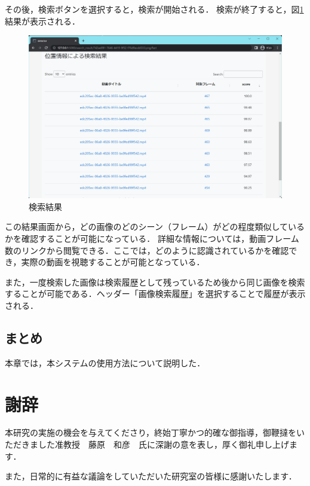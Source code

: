 \documentclass[a4j,12pt,dvipdfmx]{jreport}
\begin{document}
その後，検索ボタンを選択すると，検索が開始される．
検索が終了すると，図\ref{fig:search_result}結果が表示される．

\begin{figure}[H]
  \centering
  \includegraphics[width=13cm]{image/search_result.jpg}
  \caption{検索結果}
  \label{fig:search_result}
\end{figure}


この結果画面から，どの画像のどのシーン（フレーム）がどの程度類似しているかを確認することが可能になっている．
詳細な情報については，動画フレーム数のリンクから閲覧できる．ここでは，どのように認識されているかを確認でき，実際の動画を視聴することが可能となっている．

また，一度検索した画像は検索履歴として残っているため後から同じ画像を検索することが可能である．ヘッダー「画像検索履歴」を選択することで履歴が表示される．

\section{まとめ}
本章では，本システムの使用方法について説明した．

\clearpage

\chapter*{謝辞}
本研究の実施の機会を与えてくださり，終始丁寧かつ的確な御指導，御鞭撻をいただきました准教授　藤原　和彦　氏に深謝の意を表し，厚く御礼申し上げます．\par
また，日常的に有益な議論をしていただいた研究室の皆様に感謝いたします．

\clearpage
\end{document}
